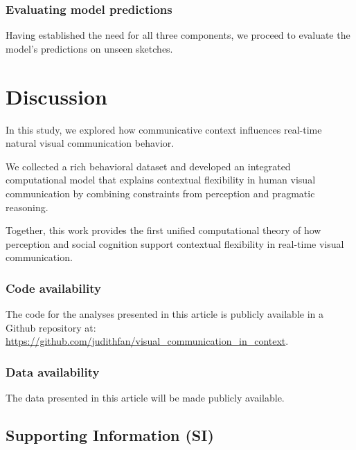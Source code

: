 \documentclass[9pt,twocolumn,twoside]{pnas-new}
\begin{document}


\subsubsection*{Evaluating model predictions}

Having established the need for all three components, we proceed to evaluate the model's predictions on unseen sketches.



\section*{Discussion}

In this study, we explored how communicative context influences real-time natural visual communication behavior.

We collected a rich behavioral dataset and developed an integrated computational model that explains contextual flexibility in human visual communication by combining constraints from perception and pragmatic reasoning.

Together, this work provides the first unified computational theory of how perception and social cognition support contextual flexibility in real-time visual communication.

\subsubsection*{Code availability} The code for the analyses presented in this article is publicly available in a Github repository at: \url{https://github.com/judithfan/visual_communication_in_context}.

\subsubsection*{Data availability} The data presented in this article will be made publicly available.

\subsection*{Supporting Information (SI)}
\end{document}
